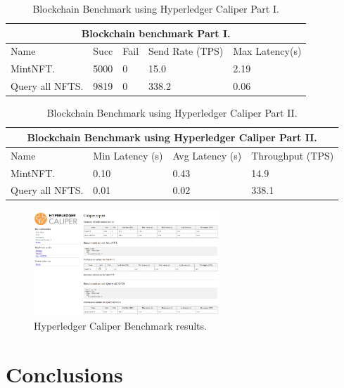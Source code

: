 \documentclass[a4paper]{article}
\begin{document}
\begin{table}[ht]
\begin{center}
\begin{tabular}{|p{2.1cm}|p{0.6cm}|p{0.4cm}|p{1.5cm}|p{1.5cm}|  }
 \hline
 \multicolumn{5}{|c|}{Blockchain benchmark Part I.} \\
 \hline
 Name & Succ  & Fail  & Send Rate (TPS) & Max Latency(s)\\
 \hline
 MintNFT.           & 5000   & 0 &   15.0  &  2.19  \\
 Query all NFTS.    & 9819   & 0 &   338.2 &  0.06 \\
 \hline
\end{tabular}
\caption{Blockchain Benchmark using Hyperledger Caliper Part I.}
\label{table:Benchmark1}
\end{center}
\end{table}

\begin{table}[ht]
\begin{center}
\begin{tabular}{ |p{2.1cm}|p{1.2cm}|p{1.5cm}|p{1.5cm}|  }
 \hline
 \multicolumn{4}{|c|}{Blockchain Benchmark using Hyperledger Caliper Part II.} \\
 \hline
 Name & Min Latency (s) & Avg Latency (s) & Throughput (TPS)\\
 \hline
 MintNFT.        & 0.10  & 0.43 & 14.9 \\
 Query all NFTS. & 0.01  & 0.02 & 338.1 \\
 \hline
\end{tabular}
\caption{Blockchain Benchmark using Hyperledger Caliper Part II.}
\label{table:Benchmark2}
\end{center}
\end{table}

 \begin{figure}[ht]
        \centering
        \includegraphics[width=7cm]{img/Caliper.png}
        \caption{Hyperledger Caliper Benchmark results.}
        \label{fig:CaliperBenchmark}
    \end{figure}

\section{Conclusions}
\end{document}
